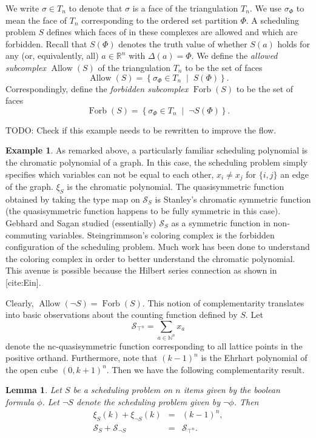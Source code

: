 \documentclass[12pt,reqno]{amsart}
\numberwithin{definition}{section}
\newtheorem{lemma}[definition]{Lemma}
\theoremstyle{definition}
\newtheorem{example}[definition]{Example}
\newcommand{\RR}{\mathbb{R}}
\newcommand{\NN}{\mathbb{N}}
\newcommand{\SSS}{\mathcal{S}}
\newcommand{\mset}[2]{ \left\{ #1 \; \middle| \; #2 \right\}}
\newcommand{\Tn}{T_n} %
\newcommand{\allow}{\operatorname{Allow}} %
\newcommand{\forb}{\operatorname{Forb}} %
\newcommand{\comment}[1]{\textsf{\footnotesize #1}}
\begin{document}
We write $\sigma\in\Tn$ to denote that $\sigma$ is a face of the triangulation $\Tn$. We use $\sigma_\Phi$ to mean the face of $\Tn$ corresponding to the ordered set partition $\Phi$. A scheduling problem $S$ defines which faces of in these complexes are allowed and which are forbidden. Recall that $S(\Phi)$ denotes the truth value of whether $S(a)$ holds for any (or, equivalently, all) $a\in\RR^n$ with $\Delta(a)=\Phi$. We define the \emph{allowed subcomplex} $\allow(S)$ of the triangulation $\Tn$ to be the set of faces 
\[
  \allow(S) = \mset{\sigma_\Phi \in \Tn}{S(\Phi)}.
\]
Correspondingly, define the \emph{forbidden subcomplex} $\forb(S)$ to be the set of faces
\[
  \forb(S) = \mset{\sigma_\Phi \in \Tn}{\neg S(\Phi)}.
\]

\comment{TODO: Check if this example needs to be rewritten to improve the flow.}

\begin{example} As remarked above, a particularly familiar scheduling polynomial is the chromatic polynomial of a graph.  In this case, the scheduling problem simply specifies which variables can not be equal to each other, $x_i \neq x_j$ for $\{i,j\}$ an edge of the graph. $\xi_S$ is the chromatic polynomial.  The quasisymmetric function obtained by taking the type map on $\SSS_S$ is Stanley's chromatic symmetric function (the quasisymmetric function happens to be fully symmetric in this case).  Gebhard and Sagan studied (essentially) $\SSS_S$ as a symmetric function in non-commuting variables.  Steingrimmson's coloring complex is 
the forbidden configuration of the scheduling problem.  
Much work has been done to understand the coloring complex in order to better understand the chromatic polynomial.  This avenue is possible because the Hilbert series connection as shown in [cite:Ein].
\end{example}

Clearly, $\allow(\neg S)=\forb(S)$. This notion of complementarity translates into basic observations about the counting function defined by $S$. Let 
\[
  \SSS_{\top^n} = \sum_{a\in\NN^n} x_a
\]
denote the nc-quasisymmetric function corresponding to all lattice points in the positive orthand. Furthermore, note that $(k-1)^n$ is the Ehrhart polynomial of the open cube $(0,k+1)^n$. Then we have the following complementarity result.

\begin{lemma}
Let $S$ be a scheduling problem on $n$ items given by the boolean formula $\phi$. Let $\neg S$ denote the scheduling problem given by $\neg\phi$. Then 
\begin{eqnarray*}
  \xi_{S}(k) + \xi_{\neg S}(k) &=& (k-1)^n, \\
  \SSS_S + \SSS_{\neg S} &=& \SSS_{\top^n}.
\end{eqnarray*}
\end{lemma}
\end{document}
